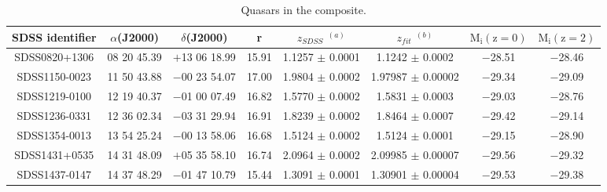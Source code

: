 \begin{table*}
\centering
\begin{center}
\caption{Quasars in the composite.}
\begin{tabular}{cccccccc}
\hline
\noalign{\smallskip}
SDSS identifier & $\alpha$(J2000) & $\delta$(J2000) & r &  $z_{SDSS}$ $^{(a)}$  &  $z_{fit}$ $^{(b)}$ & $\mathrm{M_i (z=0)}$ & $\mathrm{M_i (z=2)}$\\  
\hline

SDSS0820+1306  & 08 20 45.39 & $+$13 06 18.99 & 15.91 & 1.1257 $\pm$ 0.0001 & 1.1242 $\pm$ 0.0002  &   $-$28.51 &   $-$28.46       \\
SDSS1150-0023  & 11 50 43.88 & $-$00 23 54.07 & 17.00 & 1.9804 $\pm$ 0.0002 & 1.97987 $\pm$ 0.00002   &   $-$29.34 &   $-$29.09      \\
SDSS1219-0100  & 12 19 40.37& $-$01 00 07.49& 16.82 & 1.5770 $\pm$ 0.0002  & 1.5831 $\pm$ 0.0003  &   $-$29.03 &  $-$28.76           \\
SDSS1236-0331  & 12 36 02.34 & $-$03 31 29.94 & 16.91 & 1.8239 $\pm$ 0.0002   & 1.8464 $\pm$ 0.0007   &   $-$29.42 &   $-$29.14        \\
SDSS1354-0013  & 13 54 25.24 & $-$00 13 58.06 & 16.68 & 1.5124 $\pm$ 0.0002 & 1.5124 $\pm$  0.0001    &   $-$29.15 &  $-$28.90       \\
SDSS1431+0535  & 14 31 48.09 & $+$05 35 58.10 & 16.74 & 2.0964 $\pm$ 0.0002 & 2.09985 $\pm$  0.00007   &   $-$29.56 &  $-$29.32     \\
SDSS1437-0147  & 14 37 48.29 & $-$01 47 10.79 & 15.44 & 1.3091 $\pm$ 0.0001 & 1.30901 $\pm$  0.00004   &   $-$29.53 &   $-$29.38     \\



\hline
\hline
\end{tabular}
\end{center}


\end{table*}



